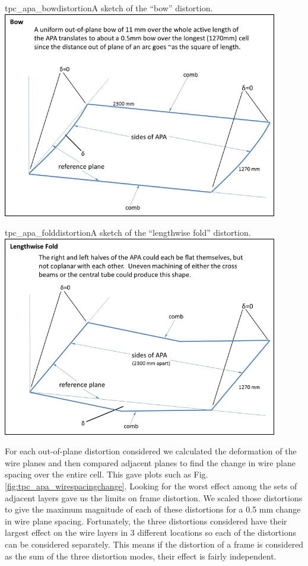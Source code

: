 \begin{cdrfigure}{tpc_apa_bowdistortion}{A sketch of the ``bow'' distortion.}
\includegraphics[width=0.9\textwidth]{figures/tpc_apa_bowdistortion.png} 
\end{cdrfigure}

\begin{cdrfigure}{tpc_apa_folddistortion}{A sketch of the ``lengthwise fold'' distortion.}
\includegraphics[width=0.9\textwidth]{figures/tpc_apa_folddistortion.png} 
\end{cdrfigure}

For each out-of-plane distortion considered we calculated the deformation of the wire planes and then compared adjacent planes to find the change in wire plane spacing over the entire cell.  This gave plots such as Fig. \ref{fig:tpc_apa_wirespacingchange}.  Looking for the worst effect among the sets of adjacent layers gave us the limits on frame distortion.  We scaled those distortions to give the maximum magnitude of each of these distortions for a 0.5 mm change in wire plane spacing.
Fortunately, the three distortions considered have their largest effect on the wire layers in 3 different locations so each of the distortions can be considered separately.  This means if the distortion of a frame is considered as the sum of the three distortion modes, their effect is fairly independent.

